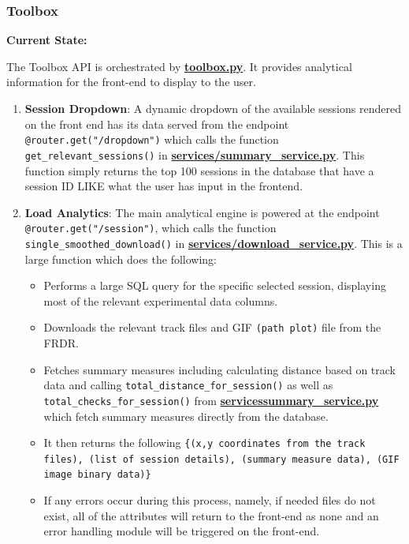 \documentclass{article}
\begin{document}
\subsubsection{Toolbox}

\par{\textbf{Current State:}}
\par{The Toolbox API is orchestrated by \href{https://github.com/OCD-Rats-Capstone/OCD-Rat-Infrastructure/blob/main/src/ocd-rat-backend/routers/toolbox.py}{\textbf{toolbox.py}}. It provides analytical information for the front-end to display to the user.}

\begin{enumerate}

  \item{\textbf{Session Dropdown}: A dynamic dropdown of the available sessions rendered on the front end has its data served from the endpoint \texttt{@router.get("/dropdown")} which calls the function \texttt{get\_relevant\_sessions()} in \href{https://github.com/OCD-Rats-Capstone/OCD-Rat-Infrastructure/blob/main/src/ocd-rat-backend/services/summary_service.py}{\textbf{services/summary\_service.py}}. This function simply returns the top 100 sessions in the database that have a session ID LIKE what the user has input in the frontend.}
  \item{\textbf{Load Analytics}: The main analytical engine is powered at the endpoint \texttt{@router.get("/session")}, which calls the function \texttt{single\_smoothed\_download()} in \href{https://github.com/OCD-Rats-Capstone/OCD-Rat-Infrastructure/blob/main/src/ocd-rat-backend/services/download_service.py}{\textbf{services/download\_service.py}}. This is a large function which does the following:
        \begin{itemize}
          \item{Performs a large SQL query for the specific selected session, displaying most of the relevant experimental data columns.}
          \item{Downloads the relevant track files and GIF \texttt{(path plot)} file from the FRDR.}
          \item{Fetches summary measures including calculating distance based on track data and calling \texttt{total\_distance\_for\_session()} as well as \texttt{total\_checks\_for\_session()} from
          \href{https://github.com/OCD-Rats-Capstone/OCD-Rat-Infrastructure/blob/main/src/ocd-rat-backend/services/summary_service.py}{\textbf{services\/summary\_service.py}} which fetch summary measures directly from the database.}
          \item{It then returns the following \texttt{\{(x,y coordinates from the track files), (list of session details), (summary measure data), (GIF image binary data)\}}}
          \item{If any errors occur during this process, namely, if needed files do not exist, all of the attributes will return to the front-end as none and an error handling module will be triggered on the front-end.}
        \end{itemize}  
          }
\end{enumerate}
\end{document}
